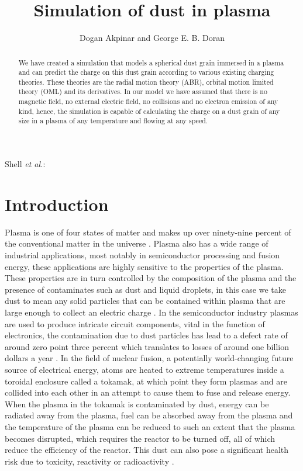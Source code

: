 \documentclass[journal]{Imperial_lab_report}
\begin{document}
\title{Simulation of dust in plasma}
\author{Dogan Akpinar and George E. B. Doran}
{Shell \MakeLowercase{\textit{et al.}}:}

\maketitle

\begin{abstract}

We have created a simulation that models a spherical dust grain immersed in a plasma and can predict the charge on this dust grain according to various existing charging theories. These theories are the radial motion theory (ABR), orbital motion limited theory (OML) and its derivatives. In our model we have assumed that there is no magnetic field, no external electric field, no collisions and no electron emission of any kind, hence, the simulation is capable of calculating the charge on a dust grain of any size in a plasma of any temperature and flowing at any speed.

\end{abstract}

\section{Introduction}

Plasma is one of four states of matter and makes up over ninety-nine percent of the conventional matter in the universe \cite{99percent}.  Plasma also has a wide range of industrial applications, most notably in semiconductor processing and fusion energy, these applications are highly sensitive to the properties of the plasma. These properties are in turn controlled by the composition of the plasma and the presence of contaminates such as dust and liquid droplets, in this case we take dust to mean any solid particles that can be contained within plasma that are large enough to collect an electric charge \cite{Thomas}. In the semiconductor industry plasmas are used to produce intricate circuit components, vital in the function of electronics, the contamination due to dust particles has lead to a defect rate of around zero point three percent which translates to losses of around one billion dollars a year \cite{Thomas}. In the field of nuclear fusion, a potentially world-changing future source of electrical energy, atoms are heated to extreme temperatures inside a toroidal enclosure called a tokamak, at which point they form plasmas and are collided into each other in an attempt to cause them to fuse and release energy. When the plasma in the tokamak is contaminated by dust, energy can be radiated away from the plasma, fuel can be absorbed away from the plasma and the temperature of the plasma can be reduced to such an extent that the plasma becomes disrupted, which requires the reactor to be turned off, all of which reduce the efficiency of the reactor. This dust can also pose a significant health risk due to toxicity, reactivity or radioactivity \cite{Thomas}.   
\end{document}
